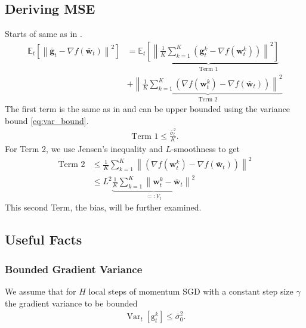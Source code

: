 \documentclass[10pt,twocolumn,letterpaper]{article}
\begin{document}
\subsection{Deriving MSE} \label{sec:derive_bias}
Starts of same as in \cite{BALLES2024P}.
\begin{align*}
    \mathbb{E}_{t}\left[\left\|\bar{\mathbf{g}}_{t}-\nabla f\left(\bar{\mathbf{w}}_{t}\right)\right\|^2\right]
    &= \underbrace{\mathbb{E}_{t}\left[\left\|\frac{1}{K} \sum_{k=1}^K\left(\mathbf{g}_{t}^k-\nabla f\left(\mathbf{w}_{t}^k\right)\right)\right\|^2\right]}_{\text {Term } 1}\\
    &+ \underbrace{\left\|\frac{1}{K} \sum_{k=1}^K\left(\nabla f\left(\mathbf{w}_{t}^k\right)-\nabla f\left(\bar{\mathbf{w}}_{t}\right)\right)\right\|^2}_{\text {Term } 2}
\end{align*}
The first term is the same as in \cite{BALLES2024P} and can be upper bounded using the variance bound \ref{eq:var_bound}.
\begin{align*}
    \text{Term 1}
    \leq \frac{\bar{\sigma}_t^2}{K}.
\end{align*}
For Term 2, we use Jensen's inequality and $L$-smoothness to get
\begin{align*}
    \text{Term 2}
    &\leq \frac{1}{K} \sum_{k=1}^K\left\|\left(\nabla f\left(\mathbf{w}_{t}^k\right)-\nabla f\left(\bar{\mathbf{w}}_{t}\right)\right)\right\|^2
    \\&\leq L^2 \underbrace{\frac{1}{K} \sum_{k=1}^K\left\|\mathbf{w}_{t}^k-\bar{\mathbf{w}}_{t}\right\|^2}_{=: V_{t}}
\end{align*}
This second Term, the bias, will be further examined.

\subsection{Useful Facts}
\subsubsection{Bounded Gradient Variance}
We assume that for $H$ local steps of momentum SGD with a constant step size $\gamma$ the gradient variance to be bounded
\begin{align}\label{eq:var_bound}
    \operatorname{Var}_{t}\left[\mathrm{g}_{t}^k\right] \leq \bar{\sigma}_0^2.
\end{align}
\end{document}
